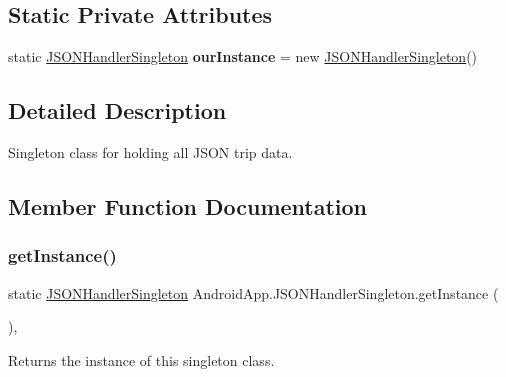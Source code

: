 \subsection*{Static Private Attributes}
\begin{DoxyCompactItemize}
\item 
\mbox{\label{class_android_app_1_1_j_s_o_n_handler_singleton_ac4e083a3f318072254453f69ea0efb88}} 
static \hyperlink{class_android_app_1_1_j_s_o_n_handler_singleton}{J\+S\+O\+N\+Handler\+Singleton} {\bfseries our\+Instance} = new \hyperlink{class_android_app_1_1_j_s_o_n_handler_singleton}{J\+S\+O\+N\+Handler\+Singleton}()
\end{DoxyCompactItemize}


\subsection{Detailed Description}
Singleton class for holding all J\+S\+ON trip data. 

\subsection{Member Function Documentation}
\mbox{\label{class_android_app_1_1_j_s_o_n_handler_singleton_a6b33b2582b9625f9ab0718013daa1aeb}} 
\subsubsection{\texorpdfstring{get\+Instance()}{getInstance()}}
{\footnotesize\ttfamily static \hyperlink{class_android_app_1_1_j_s_o_n_handler_singleton}{J\+S\+O\+N\+Handler\+Singleton} Android\+App.\+J\+S\+O\+N\+Handler\+Singleton.\+get\+Instance (\begin{DoxyParamCaption}{ }\end{DoxyParamCaption})\hspace{0.3cm}{\ttfamily [inline]}, {\ttfamily [static]}}



Returns the instance of this singleton class. 

